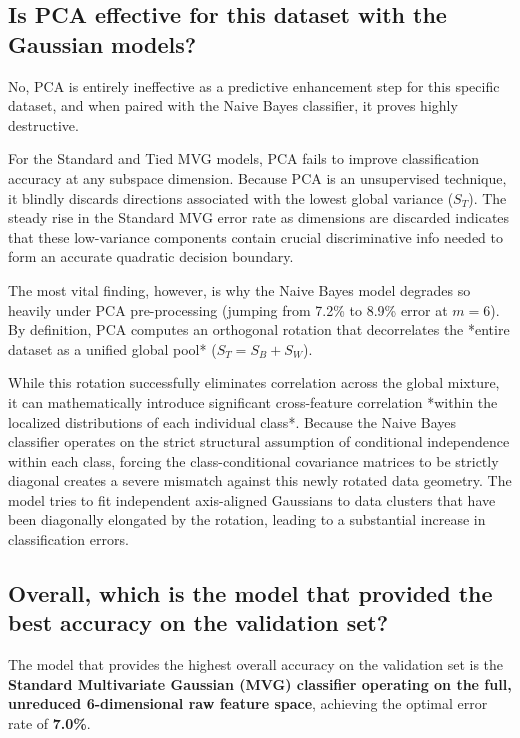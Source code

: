 \subsection*{Is PCA effective for this dataset with the Gaussian models?}

No, PCA is entirely ineffective as a predictive enhancement step for this specific dataset, and when paired with the Naive Bayes classifier, it proves highly destructive. 

For the Standard and Tied MVG models, PCA fails to improve classification accuracy at any subspace dimension. Because PCA is an unsupervised technique, it blindly discards directions associated with the lowest global variance ($S_T$). The steady rise in the Standard MVG error rate as dimensions are discarded indicates that these low-variance components contain crucial discriminative info needed to form an accurate quadratic decision boundary.

The most vital finding, however, is why the Naive Bayes model degrades so heavily under PCA pre-processing (jumping from 7.2\% to 8.9\% error at $m=6$). By definition, PCA computes an orthogonal rotation that decorrelates the *entire dataset as a unified global pool* ($S_T = S_B + S_W$). 

While this rotation successfully eliminates correlation across the global mixture, it can mathematically introduce significant cross-feature correlation *within the localized distributions of each individual class*. Because the Naive Bayes classifier operates on the strict structural assumption of conditional independence within each class, forcing the class-conditional covariance matrices to be strictly diagonal creates a severe mismatch against this newly rotated data geometry. The model tries to fit independent axis-aligned Gaussians to data clusters that have been diagonally elongated by the rotation, leading to a substantial increase in classification errors.

\subsection*{Overall, which is the model that provided the best accuracy on the validation set?}

The model that provides the highest overall accuracy on the validation set is the \textbf{Standard Multivariate Gaussian (MVG) classifier operating on the full, unreduced 6-dimensional raw feature space}, achieving the optimal error rate of \textbf{7.0\%}. 

